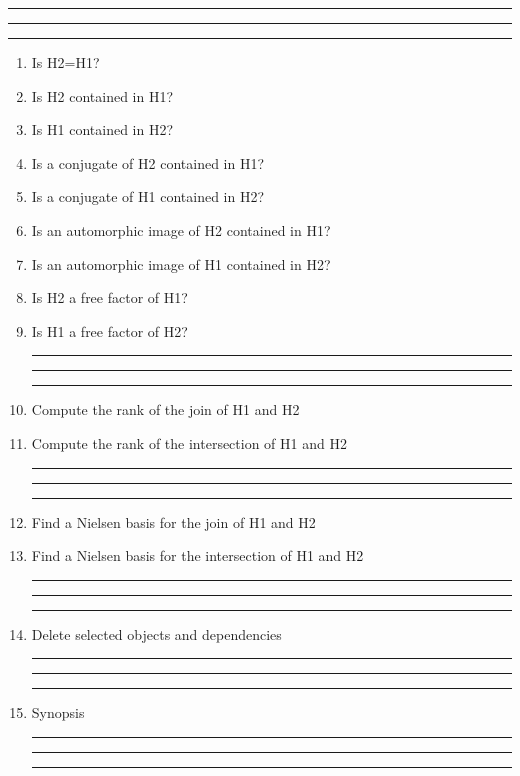 
\bigskip
\hrule\hrule\hrule

\begin{enumerate}

\item Is H2=H1?

\item Is H2 contained in H1?

\item Is H1 contained in H2?

\item Is a conjugate of H2 contained in H1?

\item Is a conjugate of H1 contained in H2?

\item Is an automorphic image of H2 contained in H1?

\item Is an automorphic image of H1 contained in H2?

\item Is H2 a free factor of H1?

\item Is H1 a free factor of H2?

\bigskip
\hrule\hrule\hrule

\item Compute the rank of the join of H1 and H2

\item Compute the rank of the intersection of H1 and H2

\bigskip
\hrule\hrule\hrule

\item Find a  Nielsen basis for the join of H1 and H2

\item Find a Nielsen basis for the intersection of H1 and H2

\bigskip
\hrule\hrule\hrule

\item Delete selected objects and dependencies

\bigskip
\hrule\hrule\hrule

\item
Synopsis

\bigskip
\hrule\hrule\hrule

\end{enumerate}
